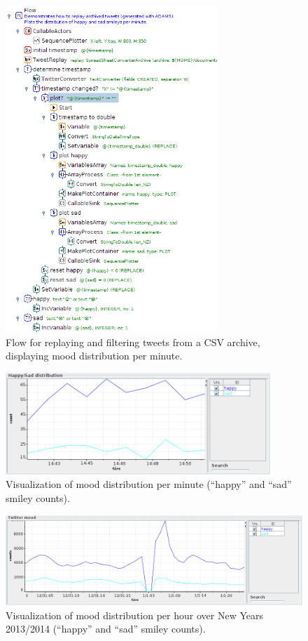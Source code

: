 \documentclass[a4paper,10pt]{book}
\begin{document}
\begin{figure}[htb]
  \centering
  \includegraphics[width=8.0cm]{images/replay_and_filter_tweets2-flow.png}
  \caption{Flow for replaying and filtering tweets from a CSV archive, displaying mood distribution per minute.}
  \label{replay_and_filter_tweets2-flow}
\end{figure}

\begin{figure}[htb]
  \centering
  \includegraphics[width=10.0cm]{images/replay_and_filter_tweets2-output.png}
  \caption{Visualization of mood distribution per minute (``happy'' and ``sad'' smiley counts).}
  \label{replay_and_filter_tweets2-output}
\end{figure}

\begin{figure}[htb]
  \centering
  \includegraphics[width=12.0cm]{images/twitter_mood.png}
  \caption{Visualization of mood distribution per hour over New Years 2013/2014 (``happy'' and ``sad'' smiley counts).}
  \label{twitter_mood}
\end{figure}
\end{document}

